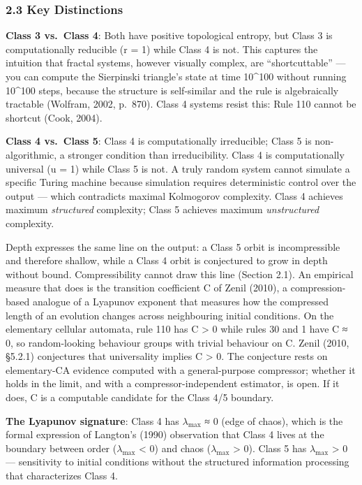 \documentclass[
]{article}
\begin{document}
\hypertarget{key-distinctions}{%
\subsubsection{2.3 Key Distinctions}\label{key-distinctions}}

\textbf{Class 3 vs.~Class 4}: Both have positive topological entropy,
but Class 3 is computationally reducible (r = 1) while Class 4 is not.
This captures the intuition that fractal systems, however visually
complex, are ``shortcuttable'' --- you can compute the Sierpinski
triangle's state at time 10\^{}100 without running 10\^{}100 steps,
because the structure is self-similar and the rule is algebraically
tractable (Wolfram, 2002, p.~870). Class 4 systems resist this: Rule 110
cannot be shortcut (Cook, 2004).

\textbf{Class 4 vs.~Class 5}: Class 4 is computationally irreducible;
Class 5 is non-algorithmic, a stronger condition than irreducibility.
Class 4 is computationally universal (u = 1) while Class 5 is not. A
truly random system cannot simulate a specific Turing machine because
simulation requires deterministic control over the output --- which
contradicts maximal Kolmogorov complexity. Class 4 achieves maximum
\emph{structured} complexity; Class 5 achieves maximum
\emph{unstructured} complexity.

Depth expresses the same line on the output: a Class 5 orbit is
incompressible and therefore shallow, while a Class 4 orbit is
conjectured to grow in depth without bound. Compressibility cannot draw
this line (Section 2.1). An empirical measure that does is the
transition coefficient C of Zenil (2010), a compression-based analogue
of a Lyapunov exponent that measures how the compressed length of an
evolution changes across neighbouring initial conditions. On the
elementary cellular automata, rule 110 has C \textgreater{} 0 while
rules 30 and 1 have C ≈ 0, so random-looking behaviour groups with
trivial behaviour on C. Zenil (2010, §5.2.1) conjectures that
universality implies C \textgreater{} 0. The conjecture rests on
elementary-CA evidence computed with a general-purpose compressor;
whether it holds in the limit, and with a compressor-independent
estimator, is open. If it does, C is a computable candidate for the
Class 4/5 boundary.

\textbf{The Lyapunov signature}: Class 4 has \(\lambda_{\max}\) ≈ 0
(edge of chaos), which is the formal expression of Langton's (1990)
observation that Class 4 lives at the boundary between order
(\(\lambda_{\max}\) \textless{} 0) and chaos (\(\lambda_{\max}\)
\textgreater{} 0). Class 5 has \(\lambda_{\max}\) \textgreater{} 0 ---
sensitivity to initial conditions without the structured information
processing that characterizes Class 4.
\end{document}
